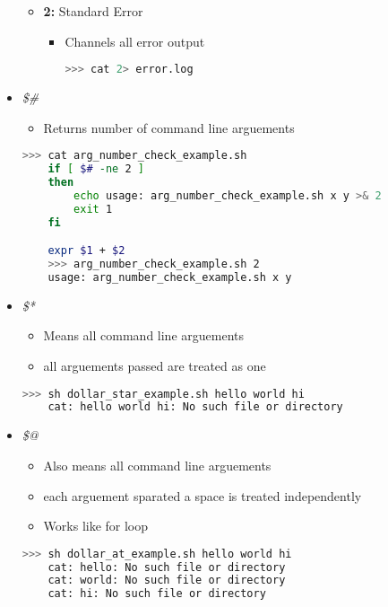 \documentclass[12pt]{article}
\begin{document}
\begin{itemize}
\begin{itemize}
    \item \textbf{2:} Standard Error
    \begin{itemize}
    \item Channels all error output

    \begin{lstlisting}[language=bash]
    >>> cat 2> error.log
    \end{lstlisting}
    \end{itemize}

    \end{itemize}
    \item \textit{\$\#}
    \begin{itemize}
    \item Returns number of command line arguements
    \end{itemize}

    \begin{lstlisting}[language=bash]
    >>> cat arg_number_check_example.sh
    if [ $# -ne 2 ]
    then
        echo usage: arg_number_check_example.sh x y >& 2
        exit 1
    fi

    expr $1 + $2
    >>> arg_number_check_example.sh 2
    usage: arg_number_check_example.sh x y
    \end{lstlisting}

    \item \textit{\$*}
    \begin{itemize}
    \item Means all command line arguements
    \item all arguements passed are treated as one
    \end{itemize}

    \begin{lstlisting}[language=bash]
    >>> sh dollar_star_example.sh hello world hi
    cat: hello world hi: No such file or directory
    \end{lstlisting}

    \item \textit{\$@}
    \begin{itemize}
    \item Also means all command line arguements
    \item each arguement sparated a space is treated independently
    \item Works like for loop
    \end{itemize}
    \begin{lstlisting}[language=bash]
    >>> sh dollar_at_example.sh hello world hi
    cat: hello: No such file or directory
    cat: world: No such file or directory
    cat: hi: No such file or directory
    \end{lstlisting}


\end{itemize}
\end{document}
